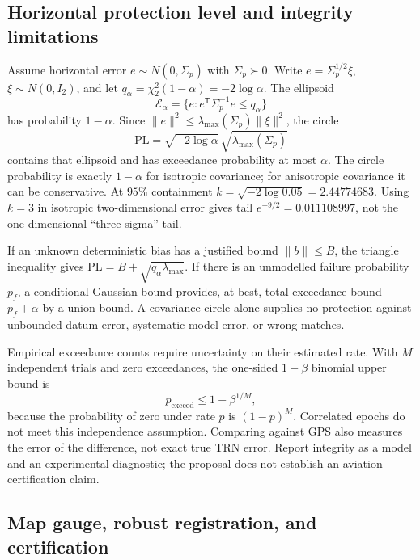 \documentclass[11pt,a4paper]{article}
\numberwithin{equation}{section}
\begin{document}
\subsection{Horizontal protection level and integrity limitations}

Assume horizontal error $e\sim N(0,\Sigma_p)$ with
$\Sigma_p\succ0$. Write $e=\Sigma_p^{1/2}\xi$,
$\xi\sim N(0,I_2)$, and let
$q_\alpha=\chi_2^2(1-\alpha)=-2\log\alpha$.
The ellipsoid
\begin{equation}
 \mathcal E_\alpha=\{e:e^{\mathsf T}\Sigma_p^{-1}e\leq q_\alpha\}
\end{equation}
has probability $1-\alpha$. Since
$\|e\|^2\leq\lambda_{\max}(\Sigma_p)\|\xi\|^2$, the circle
\begin{equation}
 \mathrm{PL}=\sqrt{-2\log\alpha}\,
                          \sqrt{\lambda_{\max}(\Sigma_p)}
 \label{eq:PL-proof}
\end{equation}
contains that ellipsoid and has exceedance probability at most
$\alpha$. The circle probability is exactly $1-\alpha$ for isotropic
covariance; for anisotropic covariance it can be conservative.
At $95\%$ containment $k=\sqrt{-2\log0.05}=2.44774683$.
Using $k=3$ in isotropic two-dimensional error gives tail
$e^{-9/2}=0.011108997$, not the one-dimensional ``three sigma'' tail.

If an unknown deterministic bias has a justified bound $\|b\|\leq B$,
the triangle inequality gives $\mathrm{PL}=B+
\sqrt{q_\alpha\lambda_{\max}}$. If there is an unmodelled failure
probability $p_f$, a conditional Gaussian bound provides, at best,
total exceedance bound $p_f+\alpha$ by a union bound. A covariance
circle alone supplies no protection against unbounded datum error,
systematic model error, or wrong matches.

Empirical exceedance counts require uncertainty on their estimated
rate. With $M$ independent trials and zero exceedances, the one-sided
$1-\beta$ binomial upper bound is
\begin{equation}
 p_{\mathrm{exceed}}\leq1-\beta^{1/M},
\end{equation}
because the probability of zero under rate $p$ is $(1-p)^M$. Correlated
epochs do not meet this independence assumption. Comparing against GPS
also measures the error of the difference, not exact true TRN error.
Report integrity as a model and an experimental diagnostic; the
proposal does not establish an aviation certification claim.

\subsection{Map gauge, robust registration, and certification}
\end{document}
